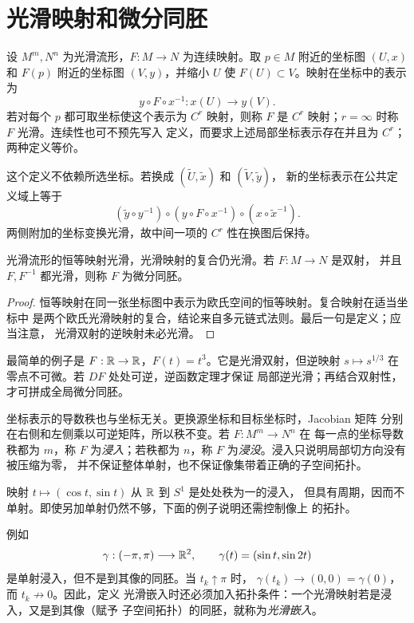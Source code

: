 \section{光滑映射和微分同胚}

设 \(M^m,N^n\) 为光滑流形，\(F:M\to N\) 为连续映射。取 \(p\in M\)
附近的坐标图 \((U,x)\) 和 \(F(p)\) 附近的坐标图 \((V,y)\)，并缩小
\(U\) 使 \(F(U)\subset V\)。映射在坐标中的表示为
\[
 y\circ F\circ x^{-1}:x(U)\longrightarrow y(V).
\]
若对每个 \(p\) 都可取坐标使这个表示为 \(C^r\) 映射，则称 \(F\) 是
\(C^r\) 映射；\(r=\infty\) 时称 \(F\) 光滑。连续性也可不预先写入
定义，而要求上述局部坐标表示存在并且为 \(C^r\)；两种定义等价。

这个定义不依赖所选坐标。若换成
\((\widetilde U,\widetilde x)\) 和 \((\widetilde V,\widetilde y)\)，
新的坐标表示在公共定义域上等于
\[
 (\widetilde y\circ y^{-1})\circ
 (y\circ F\circ x^{-1})\circ
 (x\circ\widetilde x^{-1}).
\]
两侧附加的坐标变换光滑，故中间一项的 \(C^r\) 性在换图后保持。

\begin{proposition}\label{prop:smooth-map-calculus}
光滑流形的恒等映射光滑，光滑映射的复合仍光滑。若 \(F:M\to N\) 是双射，
并且 \(F,F^{-1}\) 都光滑，则称 \(F\) 为微分同胚。
\end{proposition}

\begin{proof}
恒等映射在同一张坐标图中表示为欧氏空间的恒等映射。复合映射在适当坐标中
是两个欧氏光滑映射的复合，结论来自多元链式法则。最后一句是定义；应当注意，
光滑双射的逆映射未必光滑。
\end{proof}

最简单的例子是 \(F:\mathbb{R}\to\mathbb{R}\)，\(F(t)=t^3\)。它是光滑双射，但逆映射
\(s\mapsto s^{1/3}\) 在零点不可微。若 \(DF\) 处处可逆，逆函数定理才保证
局部逆光滑；再结合双射性，才可拼成全局微分同胚。

坐标表示的导数秩也与坐标无关。更换源坐标和目标坐标时，Jacobian 矩阵
分别在右侧和左侧乘以可逆矩阵，所以秩不变。若 \(F:M^m\to N^n\) 在
每一点的坐标导数秩都为 \(m\)，称 \(F\) 为\emph{浸入}；若秩都为
\(n\)，称 \(F\) 为\emph{浸没}。浸入只说明局部切方向没有被压缩为零，
并不保证整体单射，也不保证像集带着正确的子空间拓扑。

映射 \(t\mapsto(\cos t,\sin t)\) 从 \(\mathbb{R}\) 到 \(S^1\) 是处处秩为一的浸入，
但具有周期，因而不单射。即使另加单射仍然不够，下面的例子说明还需控制像上
的拓扑。

例如
\[
 \gamma:(-\pi,\pi)\longrightarrow\mathbb{R}^2,\qquad
 \gamma(t)=(\sin t,\sin 2t)
\]
是单射浸入，但不是到其像的同胚。当 \(t_k\uparrow\pi\) 时，
\(\gamma(t_k)\to(0,0)=\gamma(0)\)，而 \(t_k\not\to0\)。因此，定义
光滑嵌入时还必须加入拓扑条件：一个光滑映射若是浸入，又是到其像（赋予
子空间拓扑）的同胚，就称为\emph{光滑嵌入}。

